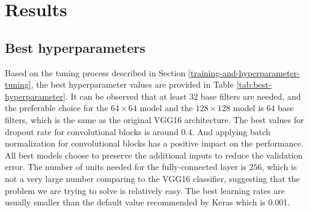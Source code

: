 \documentclass[]{interact}
\theoremstyle{plain}%
\theoremstyle{definition}
\theoremstyle{remark}
\begin{document}
\hypertarget{results}{%
\section{Results}\label{results}}

\hypertarget{best-hyperparameters}{%
\subsection{Best hyperparameters}\label{best-hyperparameters}}

Based on the tuning process described in Section
\ref{training-and-hyperparameter-tuning}, the best hyperparameter values
are provided in Table \ref{tab:best-hyperparameter}. It can be observed
that at least \(32\) base filters are needed, and the preferable choice
for the \(64 \times 64\) model and the \(128 \times 128\) model is
\(64\) base filters, which is the same as the original VGG16
architecture. The best values for dropout rate for convolutional blocks
is around \(0.4\). And applying batch normalization for convolutional
blocks has a positive impact on the performance. All best models choose
to preserve the additional inputs to reduce the validation error. The
number of units needed for the fully-connected layer is \(256\), which
is not a very large number comparing to the VGG16 classifier, suggesting
that the problem we are trying to solve is relatively easy. The best
learning rates are usually smaller than the default value recommended by
Keras which is 0.001.

\begin{table}

\caption{\label{tab:best-hyperparameter}Hyperparameters values for the best computer vision models with differnet input sizes.}
\centering
{}
\end{table}
\end{document}

